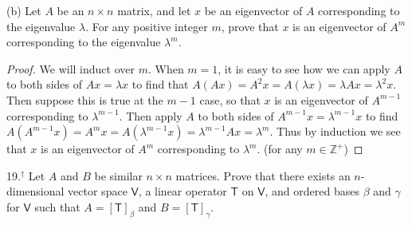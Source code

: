\documentclass[11pt]{article}
\newcommand{\sbr}[1]{\left[#1\right]}
\begin{document}
(b) Let $A$ be an $n\times n$ matrix, and let $x$ be an eigenvector of $A$ corresponding to the eigenvalue $\lambda$. For any positive integer $m$, prove that $x$ is an eigenvector of $A^m$ corresponding to the eigenvalue $\lambda^m$.

\begin{proof}
  We will induct over $m$. When $m=1$, it is easy to see how we can apply $A$ to both sides of $Ax = \lambda x$ to find that $A(Ax) = A^2 x = A(\lambda x) = \lambda Ax = \lambda^2 x$. Then suppose this is true at the $m-1$ case, so that $x$ is an eigenvector of $A^{m-1}$ corresponding to $\lambda^{m-1}$. Then apply $A$ to both sides of $A^{m-1}x = \lambda^{m-1}x$ to find $A(A^{m-1}x) = A^m x = A(\lambda^{m-1}x) = \lambda^{m-1} Ax = \lambda^m$. Thus by induction we see that $x$ is an eigenvector of $A^m$ corresponding to $\lambda^m$. (for any $m\in\mathbb{Z}^{+}$)
\end{proof}

19.$^{\dagger}$ Let $A$ and $B$ be similar $n\times n$ matrices. Prove that there exists an $n$-dimensional vector space $\mathsf{V}$, a linear operator $\mathsf{T}$ on $\mathsf{V}$, and ordered bases $\beta$ and $\gamma$ for $\mathsf{V}$ such that $A=\sbr{\mathsf{T}}_{\beta}$ and $B=\sbr{\mathsf{T}}_{\gamma}$. 
\end{document}
